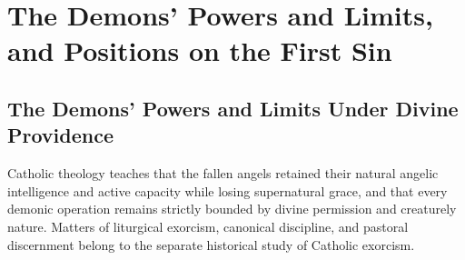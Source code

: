 \section{The Demons' Powers and Limits, and Positions on the First Sin}
\label{app:demons-first-sin}

\subsection{The Demons' Powers and Limits Under Divine Providence}

Catholic theology teaches that the fallen angels retained their natural angelic intelligence and active capacity while losing supernatural grace, and that every demonic operation remains strictly bounded by divine permission and creaturely nature. Matters of liturgical exorcism, canonical discipline, and pastoral discernment belong to the separate historical study of Catholic exorcism.

